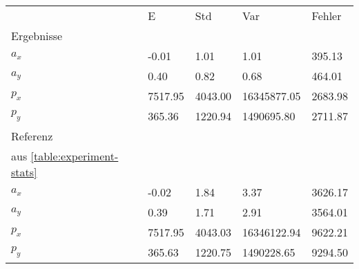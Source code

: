 \begin{tabular}{l|l|l|l|l}

     & E   & Std    & Var    & Fehler \\
\hhline{=|=|=|=|=}

Ergebnisse & & & & \\
$a_x$  &        -0.01 &         1.01 &         1.01 &       395.13 \\
$a_y$  &         0.40 &         0.82 &         0.68 &       464.01 \\
$p_x$  &      7517.95 &      4043.00 &  16345877.05 &      2683.98 \\
$p_y$  &       365.36 &      1220.94 &   1490695.80 &      2711.87 \\

\hline
Referenz & & & & \\
aus \ref{table:experiment-stats} & & & & \\
$a_x$  &        -0.02 &         1.84 &         3.37 &      3626.17 \\
$a_y$  &         0.39 &         1.71 &         2.91 &      3564.01 \\
$p_x$  &      7517.95 &      4043.03 &  16346122.94 &      9622.21 \\
$p_y$  &       365.63 &      1220.75 &   1490228.65 &      9294.50 \\
\end{tabular}
